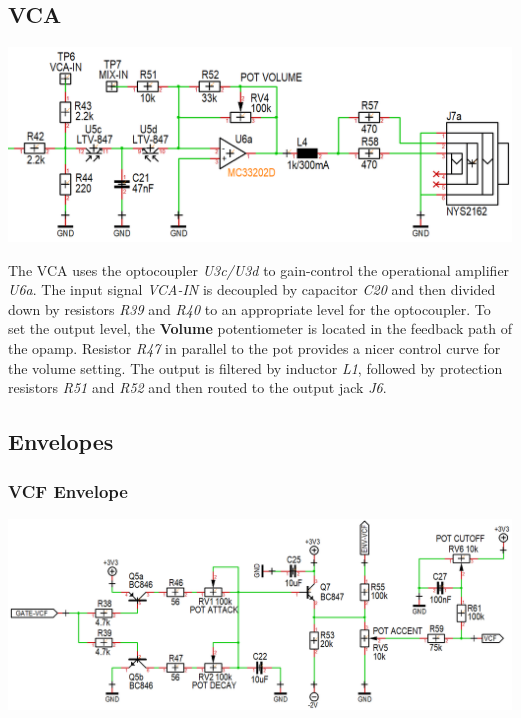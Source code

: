 \documentclass{scrartcl}
\begin{document}
\subsection{VCA}

\begin{center}
    \includegraphics[scale=0.35]{assets/schema-vca.png}
\end{center}

The VCA uses the optocoupler \emph{U3c/U3d} to gain-control the operational amplifier \emph{U6a}. The input signal \emph{VCA-IN} is decoupled by capacitor \emph{C20} and then divided down by resistors \emph{R39} and \emph{R40} to an appropriate level for the optocoupler. To set the output level, the \textbf{Volume} potentiometer is located in the feedback path of the opamp. Resistor \emph{R47} in parallel to the pot provides a nicer control curve for the volume setting. The output is filtered by inductor \emph{L1}, followed by protection resistors \emph{R51} and \emph{R52} and then routed to the output jack \emph{J6}.

\subsection{Envelopes}

\subsubsection{VCF Envelope}

\begin{center}
    \includegraphics[scale=0.35]{assets/schema-ar-vcf.png}
\end{center}
\end{document}
